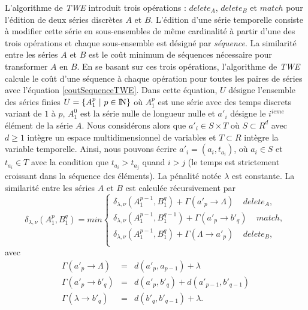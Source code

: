 L'algorithme de {\em TWE} introduit trois op\'erations : $delete_A$, $delete_B$ et $match$ pour l'\'edition de deux s\'eries discr\`etes $A$ et $B$. L'\'edition d'une s\'erie temporelle consiste \`a modifier cette s\'erie en sous-ensembles de m\^eme cardinalit\'e \`a partir d'une des trois op\'erations et chaque sous-ensemble est d\'esign\'e par  {\em s\'equence}. La similarit\'e entre les s\'eries $A$ et $B$ est le co\^ut minimum de s\'equences n\'ecessaire pour transformer $A$ en $B$.
En se basant sur ces trois op\'erations, l'algorithme de {\em TWE} calcule le co\^ut d'une s\'equence \`a chaque op\'eration pour toutes les paires de s\'eries avec l'\'equation \ref{coutSequenceTWE}. Dans cette \'equation, $U$ d\'esigne l'ensemble des s\'eries finies $U = \{A_1^p ~|~ p\in \mbox{I\hspace{-.15em}N} \}$ o\`u $A_1^p$ est une s\'erie avec des temps discrets variant de $1$ \`a $p$,
 $A_1^0$ est la s\'erie nulle de longueur nulle et 
 $a'_i$ d\'esigne le $i^{ieme}$ \'el\'ement de la s\'erie $A$.
Nous consid\'erons alors que $a'_i \in S \times T$ o\`u $S \subset R^d$ avec $d \ge 1$ int\`egre un espace multidimensionnel de variables et $T \subset R$  int\`egre la variable temporelle.
Ainsi, nous pouvons \'ecrire $a'_i = (a_i, t_{a_i})$, o\`u $a_i \in S$ et $t_{a_i} \in T$ avec la condition que  $t_{a_i} > t_{a_j}$ quand $i > j$ (le temps est strictement croissant dans la s\'equence des \'el\'ements).
La p\'enalit\'e not\'ee $\lambda$ est constante.
La similarit\'e entre les s\'eries $A$ et $B$ est calcul\'ee r\'ecursivement par 
\begin{equation}
	\delta_{\lambda,\nu}(A_1^p, B_1^q) = min
	\begin{cases}
		\delta_{\lambda,\nu}(A_1^{p-1}, B_1^q) + \Gamma(a'_p \rightarrow \Lambda) ~~~~~ delete_A, \\
		 \delta_{\lambda,\nu}(A_1^{p-1}, B_1^{q-1}) + \Gamma(a'_p \rightarrow b'_q) ~~~~~ match, \\
		 \delta_{\lambda,\nu}(A_1^{p-1}, B_1^q) + \Gamma(\Lambda \rightarrow a'_p) ~~~~~ delete_B, \\
	\end{cases}
	\label{coutSequenceTWE}
\end{equation} 
avec 
 \[
	\begin{array}{lcl} 
	\Gamma(a'_p \rightarrow \Lambda) & = & d(a'_p, a_{p-1}) + \lambda  \\ 
	\Gamma(a'_p \rightarrow b'_q) & = & d(a'_p, b'_{q}) + d(a'_{p-1}, b'_{q-1}) \\
	\Gamma(\lambda \rightarrow b'_q)  & = & d(b'_q, b'_{q-1}) + \lambda. 
	\end{array}
\]
